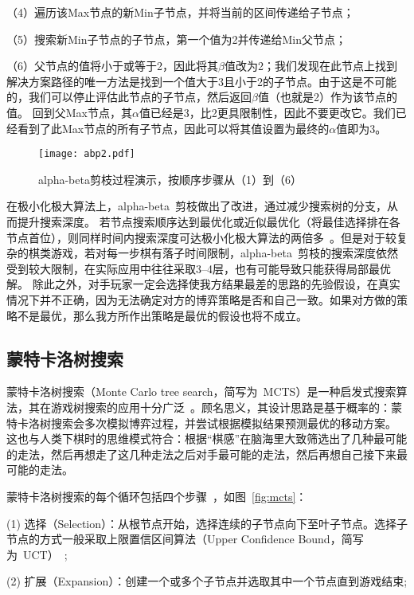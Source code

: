 （4）遍历该Max节点的新Min子节点，并将当前的区间传递给子节点；

（5）搜索新Min子节点的子节点，第一个值为2并传递给Min父节点；

（6）父节点的值将小于或等于2，因此将其$\beta$值改为2；我们发现在此节点上找到解决方案路径的唯一方法是找到一个值大于3且小于2的子节点。由于这是不可能的，我们可以停止评估此节点的子节点，然后返回$\beta$值（也就是2）作为该节点的值。
回到父Max节点，其$\alpha$值已经是3，比2更具限制性，因此不要更改它。我们已经看到了此Max节点的所有子节点，因此可以将其值设置为最终的$\alpha$值即为3。

\begin{figure}[htb]
    \centering
    \texttt{[image: abp2.pdf]}
    \caption[abp2]{%
    alpha-beta剪枝过程演示，按顺序步骤从（1）到（6）~\cite{russell2010artificial}%
      }
    \label{fig:abp2}
  \end{figure}
\newpage
在极小化极大算法上，alpha-beta~剪枝做出了改进，通过减少搜索树的分支，从而提升搜索深度。
若节点搜索顺序达到最优化或近似最优化（将最佳选择排在各节点首位），则同样时间内搜索深度可达极小化极大算法的两倍多~\cite{KNUTH1975293abp}。但是对于较复杂的棋类游戏，若对每一步棋有落子时间限制，alpha-beta~剪枝的搜索深度依然受到较大限制，在实际应用中往往采取3--4层，也有可能导致只能获得局部最优解。
除此之外，对手玩家一定会选择使我方结果最差的思路的先验假设，在真实情况下并不正确，因为无法确定对方的博弈策略是否和自己一致。如果对方做的策略不是最优，那么我方所作出策略是最优的假设也将不成立。

\subsection{蒙特卡洛树搜索}
蒙特卡洛树搜索（Monte Carlo tree search，简写为~MCTS）是一种启发式搜索算法，其在游戏树搜索的应用十分广泛~\cite{10.1007/978-3-540-75538-8_7}。顾名思义，其设计思路是基于概率的：蒙特卡洛树搜索会多次模拟博弈过程，并尝试根据模拟结果预测最优的移动方案。
这也与人类下棋时的思维模式符合：根据“棋感”在脑海里大致筛选出了几种最可能的走法，然后再想走了这几种走法之后对手最可能的走法，然后再想自己接下来最可能的走法。

蒙特卡洛树搜索的每个循环包括四个步骤~\cite{RePEc:wsi:nmncxx:v:04:y:2008:i:03:n:s1793005708001094}，如图~\ref{fig:mcts}：

(1) 选择（Selection）：从根节点开始，选择连续的子节点向下至叶子节点。选择子节点的方式一般采取上限置信区间算法（Upper Confidence Bound，简写为~UCT）~\cite{10.1007/11871842_29};

(2) 扩展（Expansion）：创建一个或多个子节点并选取其中一个节点直到游戏结束;

